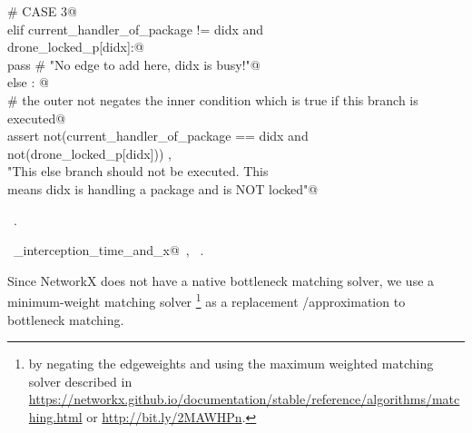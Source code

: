 \documentclass[10pt, english, oneside]{report}
\begin{document}
\begin{flushleft}
\begin{minipage}{\linewidth}
\begin{list}{}{}
\mbox{}\verb@        # CASE 3@\\
\mbox{}\verb@        elif current_handler_of_package != didx and \@\\
\mbox{}\verb@             drone_locked_p[didx]:@\\
\mbox{}\verb@               pass  # "No edge to add here, didx is busy!"@\\
\mbox{}\verb@        else : @\\
\mbox{}\verb@               # the outer not negates the inner condition which is true if this branch is executed@\\
\mbox{}\verb@               assert not(current_handler_of_package == didx and \@\\
\mbox{}\verb@                           not(drone_locked_p[didx])) ,\@\\
\mbox{}\verb@                       "This else branch should not be executed. This\@\\
\mbox{}\verb@                        means didx is handling a package and is NOT locked"@\\
\mbox{}\verb@@{\NWsep}
\end{list}
\vspace{-1.5ex}
\footnotesize
\begin{list}{}{\setlength{\itemsep}{-\parsep}\setlength{\itemindent}{-\leftmargin}}
\item \NWtxtMacroRefIn\ .
\item \NWtxtIdentsUsed\nobreak\  \verb@get_interception_time_and_x@\nobreak\ , \verb@packagelabel@\nobreak\ .
\item{}
\end{list}
\end{minipage}\vspace{4ex}
\end{flushleft}

Since NetworkX does not have a native bottleneck matching solver, we use a minimum-weight matching solver
\footnote{by negating the edgeweights and using the maximum weighted matching solver described in 
\url{https://networkx.github.io/documentation/stable/reference/algorithms/matching.html} or \url{http://bit.ly/2MAWHPn}.  } as a replacement
/approximation to bottleneck matching. 
\end{document}
